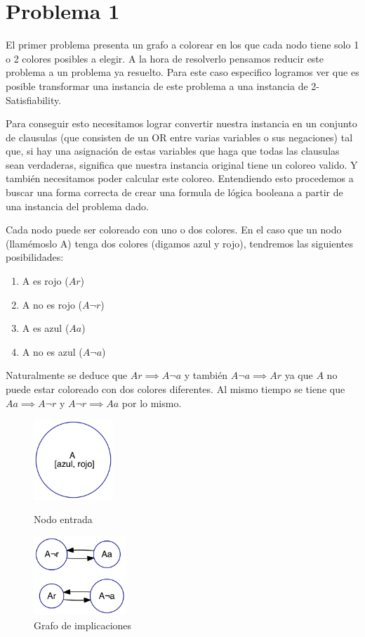 \documentclass{article}
\theoremstyle{definition}
\theoremstyle{remark}
\begin{document}
\section{Problema 1}

El primer problema presenta un grafo a colorear en los que cada nodo tiene solo 1 o 2 colores posibles a elegir. A la hora de resolverlo pensamos reducir este problema a un problema ya resuelto. Para este caso especifico logramos ver que es posible transformar una instancia de este problema a una instancia de 2-Satisfiability.\par
Para conseguir esto necesitamos lograr convertir nuestra instancia en un conjunto de clausulas (que consisten de un OR entre varias variables o sus negaciones) tal que, si hay una asignación de estas variables que haga que todas las clausulas sean verdaderas, significa que nuestra instancia original tiene un coloreo valido. Y también necesitamos poder calcular este coloreo.\smallbreak
Entendiendo esto procedemos a buscar una forma correcta de crear una formula de lógica booleana a partir de una instancia del problema dado.\par
Cada nodo puede ser coloreado con uno o dos colores. 
En el caso que un nodo (llamémoslo A) tenga dos colores (digamos azul y rojo), tendremos las siguientes posibilidades:
\begin{enumerate}
\item A es rojo ($Ar$)
\item A no es rojo ($A\neg r$)
\item A es azul ($Aa$)
\item A no es azul ($A\neg a$)
\end{enumerate}
Naturalmente se deduce que $Ar \implies A\neg a$ y también $A\neg a \implies Ar$ ya que $A$ no puede estar coloreado con dos colores diferentes. Al mismo tiempo se tiene que $Aa \implies A\neg r$ y $A\neg r \implies Aa$ por lo mismo.

\begin{figure}
\centering
\begin{minipage}{0.45\textwidth}
\centering
\includegraphics[width=3cm]{graphs/ej1/ej1_intro_2c.png}
\caption{Nodo entrada\label{grf:ex1-example-2c}}
\end{minipage}\hfill
\begin{minipage}{0.45\textwidth}
\centering
\includegraphics[width=3.5cm]{graphs/ej1/ej1_intro_2c_impl.png}
\caption{Grafo de implicaciones\label{grf:ex1-example-2c_impl}}
\end{minipage}
\end{figure}
\end{document}
